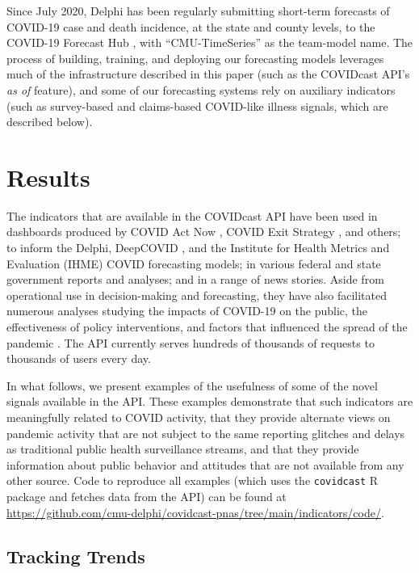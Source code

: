 \documentclass[9pt,twocolumn,twoside,lineno]{pnas-new}
\begin{document}
Since July 2020, Delphi has been regularly submitting short-term forecasts of
COVID-19 case and death incidence, at the state and county levels, to the
COVID-19 Forecast Hub \cite{ForecastHub}, with ``CMU-TimeSeries'' as the
team-model name.  The process of building, training, and deploying our
forecasting models leverages much of the infrastructure described in this paper
(such as the COVIDcast API's \textit{as of} feature), and some of our
forecasting systems rely on auxiliary indicators (such as survey-based and
claims-based COVID-like illness signals, which are described below).

\section{Results}

The indicators that are available in the COVIDcast API have been used in
dashboards produced by COVID Act Now \cite{CovidActNow}, COVID Exit Strategy
\cite{CovidExitStrategy}, and others; to inform the Delphi, DeepCOVID
\cite{Rodriguez:2021}, and the Institute for Health Metrics and Evaluation
(IHME) \cite{IHMEProj} COVID forecasting models; in various federal and state
government reports and analyses; and in a range of news stories. Aside from
operational use in decision-making and forecasting, they have also facilitated
numerous analyses studying the impacts of COVID-19 on the public, the
effectiveness of policy interventions, and factors that influenced the spread of
the pandemic \cite{Adjodah:2021, Pierri:2021, Jewell:2021, Chakrabarti:2020,
  Doerr:2021}. The API currently serves hundreds of thousands of requests to
thousands of users every day.

In what follows, we present examples of the usefulness of some of the novel
signals available in the API. These examples demonstrate that such indicators
are meaningfully related to COVID activity, that they provide alternate views on
pandemic activity that are not subject to the same reporting glitches and delays
as traditional public health surveillance streams, and that they provide
information about public behavior and attitudes that are not available from any
other source. Code to reproduce all examples (which uses the \texttt{covidcast}
R package and fetches data from the API) can be found at
\url{https://github.com/cmu-delphi/covidcast-pnas/tree/main/indicators/code/}.

\subsection{Tracking Trends}
\end{document}
